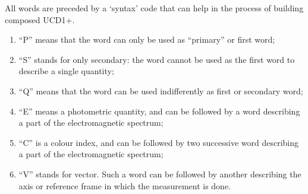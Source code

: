 \documentclass[11pt,a4paper]{ivoa}
\begin{document}
All words are preceded by a `syntax' code that can help in the process of building composed UCD1+.
\begin{enumerate}
\item ``P'' means that the word can only be used as ``primary'' or first word;
\item ``S'' stands for only secondary: the word cannot be used as the first word to describe a 
single quantity;
\item ``Q'' means that the word can be used indifferently as first or secondary word;
\item ``E'' means a photometric quantity, and can be followed by a word describing a part of 
the electromagnetic spectrum;
\item ``C'' is a colour index, and can be followed by two successive word describing a part of 
the electromagnetic spectrum;
\item ``V'' stands for vector. Such a word can be followed by another describing the axis or 
reference frame in which the measurement is done.
\end{enumerate}
\end{document}
